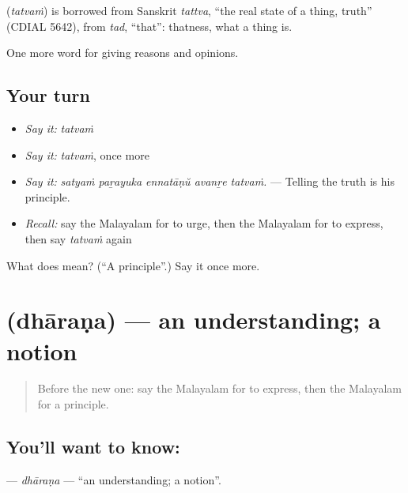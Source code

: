 \begin{cousinweb}
\textbf{} (\emph{tatvaṁ}) is borrowed from Sanskrit \emph{tattva}, \textquotedblleft{}the real state of a thing, truth\textquotedblright{} (CDIAL 5642), from \emph{tad}, \textquotedblleft{}that\textquotedblright{}: thatness, what a thing is.
\end{cousinweb}

\begin{grammarlens}[title={What you've built}]
One more word for giving reasons and opinions.
\end{grammarlens}

\subsection*{Your turn}
\begin{itemize}
\raggedright
  \item \emph{Say it:} \emph{tatvaṁ}
  \item \emph{Say it:} \emph{tatvaṁ}, once more
  \item \emph{Say it:} \emph{satyaṁ paṟayuka ennatāṇŭ avanṟe tatvaṁ.} — Telling the truth is his principle.
  \item \emph{Recall:} say the Malayalam for to urge, then the Malayalam for to express, then say \emph{tatvaṁ} again
\end{itemize}

\begin{tcolorbox}[breakable,colback=teal!4,colframe=teal!35!black,title={Before you move on}]
What does  mean? (\textquotedblleft{}A principle\textquotedblright{}.) Say it once more.
\end{tcolorbox}
\section[\texorpdfstring{\ml{ധാരണ} (dhāraṇa)}{ധാരണ (dhāraṇa)}]{ (dhāraṇa) — an understanding; a notion}

\label{lesson:ML-C414-dharana}



\begin{quote}
Before the new one: say the Malayalam for to express, then the Malayalam for a principle.
\end{quote}

\subsection*{You'll want to know: }
\textbf{} — \emph{dhāraṇa} — \textquotedblleft{}an understanding; a notion\textquotedblright{}.

